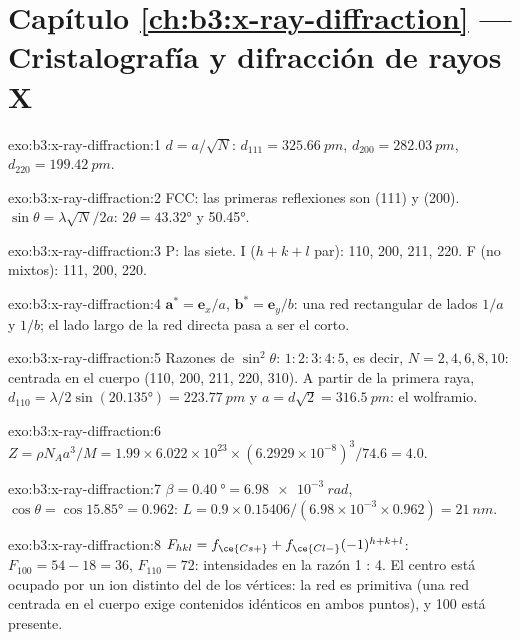 \section*{Capítulo \ref{ch:b3:x-ray-diffraction} --- Cristalografía y difracción de rayos X}

\begin{solution}{exo:b3:x-ray-diffraction:1}
$d = a/\sqrt N$: $d_{111} = \qty{325.66}{pm}$, $d_{200} = \qty{282.03}{pm}$, $d_{220} =
\qty{199.42}{pm}$.
\end{solution}

\begin{solution}{exo:b3:x-ray-diffraction:2}
FCC: las primeras reflexiones son (111) y (200). $\sin\theta = \lambda\sqrt N/2a$: $2\theta =
\ang{43.32}$ y \ang{50.45}.
\end{solution}

\begin{solution}{exo:b3:x-ray-diffraction:3}
P: las siete. I ($h + k + l$ par): 110, 200, 211, 220. F (no mixtos): 111, 200, 220.
\end{solution}

\begin{solution}{exo:b3:x-ray-diffraction:4}
$\mathbf a^* = \mathbf e_x/a$, $\mathbf b^* = \mathbf e_y/b$: una red rectangular de lados $1/a$
y $1/b$; el lado largo de la red directa pasa a ser el corto.
\end{solution}

\begin{solution}{exo:b3:x-ray-diffraction:5}
Razones de $\sin^2\theta$: $1 : 2 : 3 : 4 : 5$, es decir, $N = 2, 4, 6, 8, 10$: centrada en el cuerpo (110,
200, 211, 220, 310). A partir de la primera raya, $d_{110} = \lambda/2\sin(\ang{20.135}) =
\qty{223.77}{pm}$ y $a = d\sqrt2 = \qty{316.5}{pm}$: el wolframio.
\end{solution}

\begin{solution}{exo:b3:x-ray-diffraction:6}
$Z = \rho N_Aa^3/M = 1.99 \times 6.022\times10^{23} \times (6.2929\times10^{-8})^3/74.6 = 4.0$.
\end{solution}

\begin{solution}{exo:b3:x-ray-diffraction:7}
$\beta = \qty{0.40}{\degree} = \qty{6.98e-3}{rad}$, $\cos\theta = \cos\ang{15.85} = 0.962$:
$L = 0.9 \times 0.15406/(6.98\times10^{-3} \times 0.962) = \qty{21}{nm}$.
\end{solution}

\begin{solution}{exo:b3:x-ray-diffraction:8}
$F_{hkl} = f_{\ce{Cs+}} + f_{\ce{Cl-}}(-1)^{h+k+l}$: $F_{100} = 54 - 18 = 36$, $F_{110} = 72$:
intensidades en la razón 1 : 4. El centro está ocupado por un ion distinto del de
los vértices: la red es primitiva (una red centrada en el cuerpo exige contenidos
idénticos en ambos puntos), y 100 está presente.
\end{solution}

